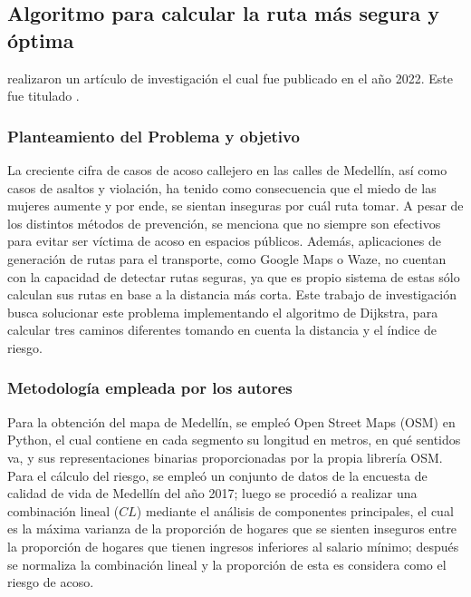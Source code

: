 \subsection{Algoritmo para calcular la ruta más segura y óptima \citep*{pr_areiza}}
\citeauthor{pr_areiza} realizaron un artículo de investigación el cual fue publicado en el año 2022. Este fue titulado .

\subsubsection{Planteamiento del Problema y objetivo }
La creciente cifra de casos de acoso callejero en las calles de Medellín, así como casos de asaltos y violación, ha tenido como consecuencia que el miedo de las mujeres aumente y por ende, se sientan inseguras por cuál ruta tomar. A pesar de los distintos métodos de prevención, se menciona que no siempre son efectivos para evitar ser víctima de acoso en espacios públicos. Además, aplicaciones de generación de rutas para el transporte, como Google Maps o Waze, no cuentan con la capacidad de detectar rutas seguras, ya que es propio sistema de estas sólo calculan sus rutas en base a la distancia más corta. Este trabajo de investigación busca solucionar este problema implementando el algoritmo de Dijkstra, para calcular tres caminos diferentes tomando en cuenta la distancia y el índice de riesgo.

\subsubsection{Metodología empleada por los autores}


Para la obtención del mapa de Medellín, se empleó Open Street Maps (OSM) en Python, el cual contiene en cada segmento su longitud en metros, en qué sentidos va, y sus representaciones binarias proporcionadas por la propia librería OSM. Para el cálculo del riesgo, se empleó un conjunto de datos de la encuesta de calidad de vida de Medellín del año 2017; luego se procedió a realizar una combinación lineal ($CL$)  mediante el análisis de componentes principales, el cual  es la máxima varianza de la proporción de hogares que se sienten inseguros entre la proporción de hogares que tienen ingresos inferiores al salario mínimo; después se normaliza la combinación lineal y la proporción de esta es considera como el riesgo de acoso.

